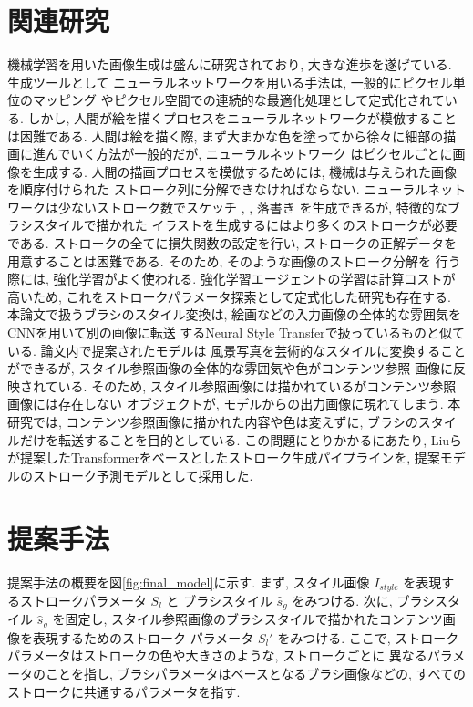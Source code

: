\documentclass[MIRU,submit,uplatex]{miru2023j}
\begin{document}
\section{関連研究}
機械学習を用いた画像生成は盛んに研究されており, 大きな進歩を遂げている. 生成ツールとして
ニューラルネットワークを用いる手法は, 一般的にピクセル単位のマッピング\cite{PerceptualLosses}
やピクセル空間での連続的な最適化処理\cite{IST}として定式化されている.
しかし, 人間が絵を描くプロセスをニューラルネットワークが模倣することは困難である. 人間は絵を描く際,
まず大まかな色を塗ってから徐々に細部の描画に進んでいく方法が一般的だが, ニューラルネットワーク
はピクセルごとに画像を生成する. 人間の描画プロセスを模倣するためには, 機械は与えられた画像を順序付けられた
ストローク列に分解できなければならない. ニューラルネットワークは少ないストローク数でスケッチ
\cite{DBLP:journals/corr/HaE17}, \cite{DBLP:journals/corr/abs-1805-00247}, 落書き
\cite{DBLP:journals/corr/abs-1810-05977} を生成できるが, 特徴的なブラシスタイルで描かれた
イラストを生成するにはより多くのストロークが必要である. ストロークの全てに損失関数の設定を行い, 
ストロークの正解データを用意することは困難である. そのため, そのような画像のストローク分解を
行う際には, 強化学習がよく使われる. \cite{DBLP:journals/corr/abs-1804-01118, DBLP:journals/corr/abs-1206-4634, Huang_2019_ICCV}
強化学習エージェントの学習は計算コストが高いため, これをストロークパラメータ探索として定式化した研究も存在する. 
\cite{PaintTransformer}
本論文で扱うブラシのスタイル変換は, 絵画などの入力画像の全体的な雰囲気をCNNを用いて別の画像に転送
するNeural Style Transfer\cite{IST}で扱っているものと似ている. 論文内で提案されたモデルは
風景写真を芸術的なスタイルに変換することができるが, スタイル参照画像の全体的な雰囲気や色がコンテンツ参照
画像に反映されている. そのため, スタイル参照画像には描かれているがコンテンツ参照画像には存在しない
オブジェクトが, モデルからの出力画像に現れてしまう.
本研究では, コンテンツ参照画像に描かれた内容や色は変えずに,
ブラシのスタイルだけを転送することを目的としている. この問題にとりかかるにあたり, 
Liuら\cite{PaintTransformer}が提案したTransformerをベースとしたストローク生成パイプラインを,
提案モデルのストローク予測モデルとして採用した.

\section{提案手法}
提案手法の概要を図\ref{fig:final_model}に示す. 
まず, スタイル画像 $I_{style}$ を表現するストロークパラメータ $S_l$ と
ブラシスタイル $\hat{s}_g$ をみつける. 次に, ブラシスタイル $\hat{s}_g$ を固定し, 
スタイル参照画像のブラシスタイルで描かれたコンテンツ画像を表現するためのストローク
パラメータ $S_l'$ をみつける. 
ここで, ストロークパラメータはストロークの色や大きさのような, ストロークごとに
異なるパラメータのことを指し, ブラシパラメータはベースとなるブラシ画像などの, 
すべてのストロークに共通するパラメータを指す. 
\end{document}
